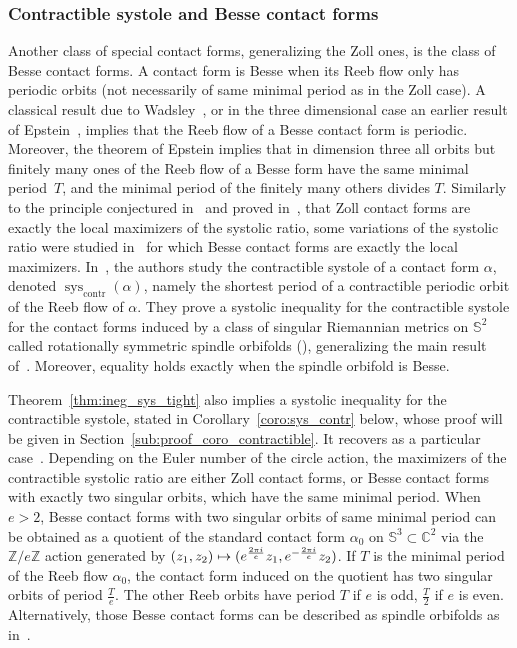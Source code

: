 \documentclass[AHL,Unicode,longabstracts]{cedram}
\DeclareMathOperator{\sys}{sys}
\DeclareMathOperator{\contr}{contr}
\newcommand{\bbS}{\mathbb{S}}
\newcommand{\bbZ}{\mathbb{Z}}
\newcommand{\bbC}{\mathbb{C}}
\let\oldmapsto\mapsto
\renewcommand*{\mapsto}{\mathchoice{\longmapsto}{\oldmapsto}{\oldmapsto}{\oldmapsto}}
\newcommand{\bbS}{\mathbb{S}}
\begin{document}
\subsubsection{Contractible systole and Besse contact forms}\label{ssub:contractible_systole_and_besse_contact_forms}

Another class of special contact forms, generalizing the Zoll ones, is the class of Besse contact forms. A contact form is Besse when its Reeb flow only has periodic orbits (not necessarily of same minimal period as in the Zoll case). A classical result due to Wadsley~\cite{Wadsley_1975}, or in the three dimensional case an earlier result of Epstein~\cite{Epstein}, implies that the Reeb flow of a Besse contact form is periodic. Moreover, the theorem of Epstein implies that in dimension three all orbits but finitely many ones of the Reeb flow of a Besse form have the same minimal period~$T$, and the minimal period of the finitely many others divides $T$. Similarly to the principle conjectured in~\cite{paiva_2014_contact} and proved in~\cite{Abbondandolo_Benedetti_2023,Abbondandolo2018,
benedetti_kang_2020}, that Zoll contact forms are exactly the local maximizers of the systolic ratio, some variations of the systolic ratio were studied in~\cite{abbondandolo:ensl-03357629,baracco2023local,
MR4529024} for which Besse contact forms are exactly the local maximizers. In~\cite{MR4529024}, the authors study the contractible systole of a contact form $\alpha$, denoted $\sys_{\contr}(\alpha)$, namely the shortest period of a contractible periodic orbit of the Reeb flow of $\alpha$. They prove a systolic inequality for the contractible systole for the contact forms induced by a class of singular Riemannian metrics on $\bbS^2$ called rotationally symmetric spindle orbifolds (\cite[Theorem~A]{MR4529024}), generalizing the main result of~\cite{ABHS_revol}. Moreover, equality holds exactly when the spindle orbifold is Besse.

Theorem~\ref{thm:ineg_sys_tight} also implies a systolic inequality for the contractible systole, stated in Corollary~\ref{coro:sys_contr} below, whose proof will be given in Section~\ref{sub:proof_coro_contractible}. It recovers as a particular case~\cite[Theorem~A]{MR4529024}. Depending on the Euler number of the circle action, the maximizers of the contractible systolic ratio are either Zoll contact forms, or Besse contact forms with exactly two singular orbits, which have the same minimal period. When $e>2$, Besse contact forms with two singular orbits of same minimal period can be obtained as a quotient of the standard contact form $\alpha_0$ on $\bbS^3 \subset \bbC ^2$ via the $\bbZ/ e \bbZ$ action generated by $(z_1, z_2) \mapsto (e^{\frac{2 \pi i}{e}} z_1, e^{-\frac{2 \pi i}{e}} z_2)$. If $T$ is the minimal period of the Reeb flow $\alpha_0$, the contact form induced on the quotient has two singular orbits of period $\frac{T}{e}$. The other Reeb orbits have period $T$ if $e$ is odd, $\frac{T}{2}$ if $e$ is even. Alternatively, those Besse contact forms can be described as spindle orbifolds as in~\cite{MR4529024}.
\end{document}
